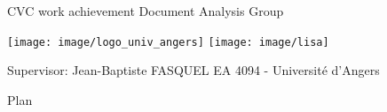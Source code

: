 



\begin{frame}
	\center CVC work achievement 
	\center Document Analysis Group\vspace{2em}
	\titlepage
	\thispagestyle{empty}
	\begin{center}
	\end{center}
		\texttt{[image: image/logo\_univ\_angers]}\hspace{13em}
		\texttt{[image: image/lisa]}

		\tiny	Supervisor: Jean-Baptiste FASQUEL \hspace{19em}	EA 4094 - Université d’Angers

\end{frame}


\begin{frame} 
	\begin{center}{\Large Plan }\end{center}

	\thispagestyle{empty}
	\begin{columns}[c]
		\column{15em}
		\tableofcontents[hideallsubsections]
		\column{15em}
	\end{columns}

	\setcounter{page}{0}
\end{frame}

